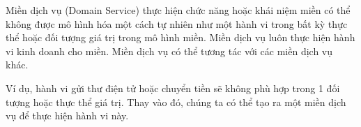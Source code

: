 Miền dịch vụ (Domain Service) thực hiện chức năng hoặc khái niệm miền có thể không được mô hình hóa một cách tự nhiên như một hành vi trong bất kỳ thực thể hoặc đối tượng giá trị trong mô hình miền. Miền dịch vụ luôn thực hiện hành vi kinh doanh cho miền. Miền dịch vụ có thể tương tác với các miền dịch vụ khác.

\begin{example} Ví dụ, hành vi gửi thư điện tử hoặc chuyển tiền sẽ không phù hợp trong 1 đối tượng hoặc thực thể giá trị. Thay vào đó, chúng ta có thể tạo ra một miền dịch vụ để thực hiện hành vi này.

\end{example}


